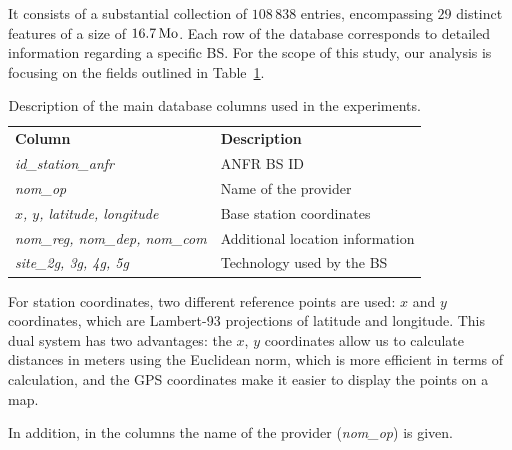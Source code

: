 \documentclass[lettersize,journal,english]{IEEEtran}
\begin{document}
        It consists of a substantial collection of $108\,838$ entries, encompassing $29$ distinct features of a size of $\unit[16.7]{Mo}$.
        Each row of the database corresponds to detailed information regarding a specific BS. For the scope of this study, our analysis is focusing on the fields outlined in Table~\ref{table:data_columns}.
        \begin{table}
            \centering
            \caption{Description of the main database columns used in the experiments.}
            \label{table:data_columns}
            \begin{tabular}{ll}
                \toprule
                \textbf{Column} & \textbf{Description} \\
                \cmidrule(lr){1-2}
                \textsl{id\_station\_anfr} & ANFR BS ID \\ 
                \textsl{nom\_op} & Name of the provider \\
                \textsl{$x$, $y$, latitude, longitude} & Base station coordinates \\ 
                \textsl{nom\_reg, nom\_dep, nom\_com} & Additional location information \\  
                \textsl{site\_2g, 3g, 4g, 5g} & Technology used by the BS \\ 
                \bottomrule
            \end{tabular}
        \end{table}

        For station coordinates, two different reference points are used: $x$ and $y$ coordinates, which are Lambert-93 projections of latitude and longitude.
        This dual system has two advantages: the $x$, $y$ coordinates allow us to calculate distances in meters using the Euclidean norm, which is more efficient in terms of calculation, and the GPS coordinates make it easier to display the points on a map.

        In addition, in the columns the name of the provider (\textsl{nom\_op}) is given.
\end{document}
